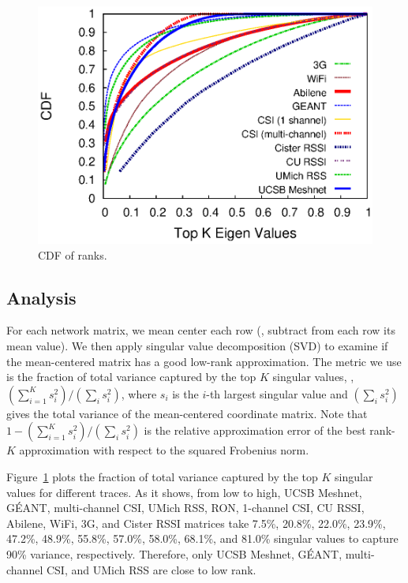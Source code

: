 \begin{figure}[h!]
  \centering
  \includegraphics[width=\figurewidthA]{fig/matrix.na0.anom0.rank.eps}
  \caption{CDF of ranks.}
  \label{fig:original-matrix-rank}
\end{figure}

\subsection{Analysis}
\label{ssec:analysis}

 For each network matrix, we mean center each row (\ie, subtract from
each row its mean value).  We then apply singular value decomposition
(SVD) to examine if the mean-centered matrix has a good low-rank
approximation.  The metric we use is the fraction of total variance
captured by the top $K$ singular values, \ie, $\left({\sum_{i=1}^{K}
  s_i^2}\right)/\left({\sum_{i} s_i^2}\right)$, where $s_i$ is the
$i$-th largest singular value and $\left({\sum_{i} s_i^2}\right)$
gives the total variance of the mean-centered coordinate matrix.  Note
that $1 - \left({\sum_{i=1}^{K} s_i^2}\right)/\left({\sum_{i}
  s_i^2}\right)$ is the relative approximation error of the best
rank-$K$ approximation with respect to the squared Frobenius norm.

Figure~\ref{fig:original-matrix-rank} plots the fraction of total
variance captured by the top $K$ singular values for different
traces. 
As it shows,
from low to high, UCSB Meshnet, G\'{E}ANT, multi-channel CSI, UMich RSS, RON, 
1-channel CSI, CU RSSI, Abilene, WiFi, 3G, and Cister RSSI
matrices take 7.5\%, 20.8\%, 22.0\%, 23.9\%, 47.2\%, 
48.9\%, 55.8\%, 57.0\%, 58.0\%, 68.1\%, and 81.0\%
singular values to capture 90\% variance, respectively. Therefore,
only UCSB Meshnet, G\'{E}ANT, multi-channel CSI, and UMich RSS are
close to low rank.

